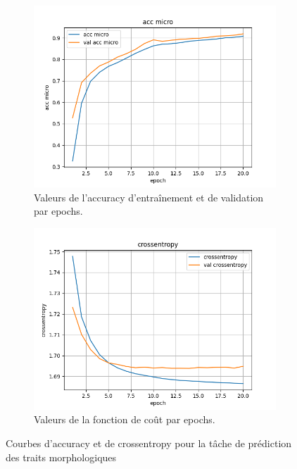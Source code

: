\documentclass[a4paper]{article}
\begin{document}
\begin{figure}[H]
    \centering
    \begin{subfigure}{0.45\textwidth}
        \centering
        \includegraphics[width=\linewidth]{../logs/get_morphy_sep0_French_0/acc micro.png}
        \caption{Valeurs de l'accuracy d'entraînement et de validation par epochs.}
    \end{subfigure}
    \hfill
    \begin{subfigure}{0.45\textwidth}
        \centering
        \includegraphics[width=\linewidth]{../logs/get_morphy_sep0_French_0/crossentropy.png}
        \caption{Valeurs de la fonction de coût par epochs.}
    \end{subfigure}
    \caption{Courbes d'accuracy et de crossentropy pour la tâche de prédiction des traits morphologiques}
\end{figure}
\end{document}
